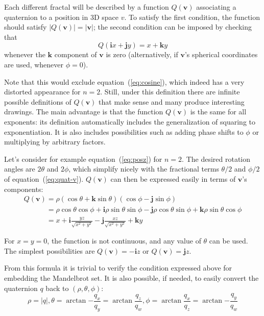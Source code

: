 \documentclass{article}
\let\vec\mathbf
\newcommand{\mathnewline}[1][\quad]{\\\phantom{#1}}
\begin{document}
Each different fractal will be described by a function $Q(\vec{v})$
associating a quaternion to a position in 3D space $v$.  To satisfy
the first condition, the function should satisfy $|Q(\vec{v})| =
|\vec{v}|$; the second condition can be imposed by checking that
\begin{equation*}
\label{eq:its-mandel}
 Q(\vec{i}x+\vec{j}y) = x+\vec{k}y
\end{equation*}
\noindent
whenever the $\vec{k}$ component of $\vec{v}$ is zero (alternatively,
if $\vec{v}$'s spherical coordinates are used, whenever $\phi = 0$).

Note that this would exclude equation~(\ref{eq:cosine}), which indeed
has a very distorted appearance for $n=2$.  Still, under this definition
there are infinite possible definitions of $Q(\vec{v})$ that make sense
and many produce interesting drawings.  The main advantage is that the
function $Q(\vec{v})$ is the same for all exponents: its definition
automatically includes the generalization of squaring to exponentiation.
It is also includes possibilities such as adding phase shifts to $\phi$
or multiplying by arbitrary factors.

Let's consider for example equation~(\ref{eq:posz}) for $n=2$.  The
desired rotation angles are $2\theta$ and $2\phi$, which simplify
nicely with the fractional terms $\theta/2$ and $\phi/2$ of
equation~(\ref{eq:quat-v}). $Q(\vec{v})$ can then be expressed easily
in terms of $\vec{v}$'s components:
\begin{equation}
  \label{eq:posz-q}
  \begin{array}{l}
  Q(\vec{v}) = \rho (\cos \theta + \vec{k} \sin \theta) (\cos \phi - \vec{j} \sin \phi)
  \mathnewline[Q(\vec{v})] = \rho \cos \theta \cos \phi + \vec{i} \rho \sin \theta \sin \phi - \vec{j} \rho \cos \theta \sin \phi + \vec{k} \rho \sin \theta \cos \phi
  \mathnewline[Q(\vec{v})] = x + \vec{i}\frac{y z}{\sqrt{x^2 + y^2}} - \vec{j}\frac{x z}{\sqrt{x^2 + y^2}} + \vec{k} y
\end{array}
\end{equation}

\noindent
For $x=y=0$, the function is not continuous, and any value of $\theta$
can be used.  The simplest possibilities are $Q(\vec{v}) = -\vec{i}z$
or $Q(\vec{v}) = \vec{j}z$.

From this formula it is trivial to verify the condition expressed
above for embedding the Mandelbrot set.  It is also possible, if
needed, to easily convert the quaternion $q$ back to $(\rho, \theta,
\phi)$:
\begin{equation*}
  \rho = |q|, \theta = \arctan {-\frac{q_x}{q_y}} = \arctan {\frac{q_z}{q_w}},
  \phi = \arctan {\frac{q_x}{q_z}} = \arctan {-\frac{q_y}{q_w}}
\end{equation*}
\end{document}
